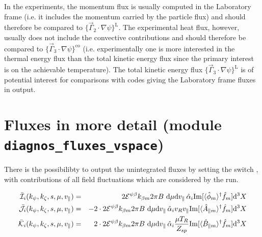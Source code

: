 In the experiments, the momentum flux is usually computed in the Laboratory frame (i.e. it includes the momentum carried by the particle flux) and should therefore be compared to $\{\vec{\Gamma}_2 \cdot \nabla \psi\}^\textrm{L}$. The experimental heat flux, however, usually does not include the convective contributions and should therefore be compared to  $\{\vec{\Gamma}_3 \cdot \nabla \psi\}^\textrm{co}$ (i.e. experimentally one is more interested in the thermal energy flux than the total kinetic energy flux since the primary interest is on the achievable temperature).
The total kinetic energy flux $\{\vec{\Gamma}_3 \cdot \nabla \psi\}^\textrm{L}$ is of potential interest for comparisons with codes giving the Laboratory frame fluxes in output. 


\section{Fluxes in more detail (module \texttt{diagnos\_fluxes\_vspace})}

There is the possibilibty to output the unintegrated fluxes by setting
the switch , with contributions of all field
fluctuations which are considered by the run.

\begin{align}
\label{eq.fluxes-detail}
\bar{\cal I}_i(k_\psi,k_\zeta,s,\mu,v_\parallel) &=& 2 {\cal E}^{\psi \beta} k_{\beta m }  2 \pi B ~{\rm d} 
\mu {\rm d} v_\parallel \,  \hat{\alpha}_i {\rm Im} [ \langle \hat \phi_m \rangle^\dagger \hat f_m ] \mathrm{d}^3X\\
\bar{\cal J}_i(k_\psi,k_\zeta,s,\mu,v_\parallel) &=& -2 \cdot 2 {\cal E}^{\psi \beta} k_{\beta m } 2 \pi B ~{\rm d} 
\mu {\rm d} v_\parallel \,  \hat{\alpha}_i v_R v_\parallel {\rm Im} [ \langle \hat A_{\parallel m} \rangle^\dagger \hat f_m ] \mathrm{d}^3X \\
\bar{\cal K}_i(k_\psi,k_\zeta,s,\mu,v_\parallel) &=& 2 \cdot 2 {\cal E}^{\psi \beta} k_{\beta m } 2 \pi B ~{\rm d} 
\mu {\rm d} v_\parallel \,  \hat{\alpha}_i \frac{\mu T_R}{Z_{sp}} {\rm Im} [ \langle \hat B_{\parallel m} \rangle^\dagger \hat f_m ] \mathrm{d}^3X
\end{align}


